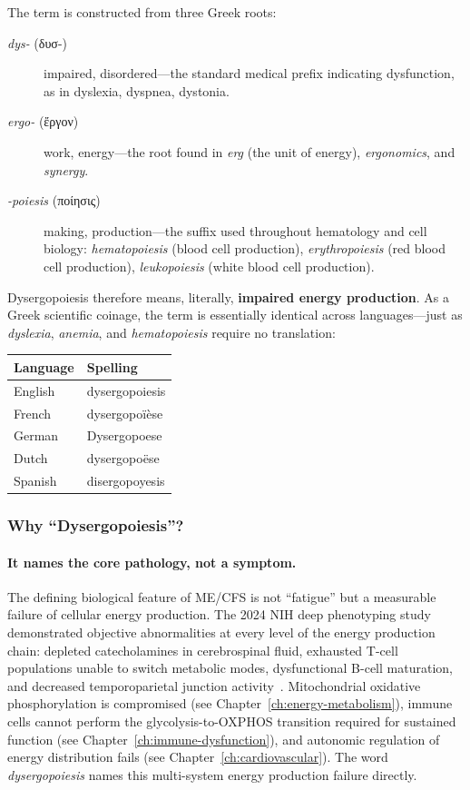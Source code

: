 The term is constructed from three Greek roots:

\begin{description}
    \item[\emph{dys-} (δυσ-)] impaired, disordered---the standard medical prefix indicating dysfunction, as in dys\-lexia, dys\-pnea, dys\-tonia.
    \item[\emph{ergo-} (ἔργον)] work, energy---the root found in \emph{erg} (the unit of energy), \emph{ergonomics}, and \emph{synergy}.
    \item[\emph{-poiesis} (ποίησις)] making, production---the suffix used throughout hematology and cell biology: \emph{hematopoiesis} (blood cell production), \emph{erythropoiesis} (red blood cell production), \emph{leukopoiesis} (white blood cell production).
\end{description}

\noindent Dysergopoiesis therefore means, literally, \textbf{impaired energy production}. As a Greek scientific coinage, the term is essentially identical across languages---just as \emph{dyslexia}, \emph{anemia}, and \emph{hematopoiesis} require no translation:

\begin{center}
\begin{tabular}{ll}
\toprule
\textbf{Language} & \textbf{Spelling} \\
\midrule
English    & dysergopoiesis \\
French     & dysergopoïèse \\
German     & Dysergopoese \\
Dutch      & dysergopoëse \\
Spanish    & disergopoyesis \\
\bottomrule
\end{tabular}
\end{center}

\subsubsection{Why ``Dysergopoiesis''?}

\paragraph{It names the core pathology, not a symptom.}
The defining biological feature of ME/CFS is not ``fatigue'' but a measurable failure of cellular energy production. The 2024 NIH deep phenotyping study demonstrated objective abnormalities at every level of the energy production chain: depleted catecholamines in cerebrospinal fluid, exhausted T-cell populations unable to switch metabolic modes, dysfunctional B-cell maturation, and decreased temporoparietal junction activity~\cite{walitt2024deep}. Mitochondrial oxidative phosphorylation is compromised (see Chapter~\ref{ch:energy-metabolism}), immune cells cannot perform the glycolysis-to-OXPHOS transition required for sustained function (see Chapter~\ref{ch:immune-dysfunction}), and autonomic regulation of energy distribution fails (see Chapter~\ref{ch:cardiovascular}). The word \emph{dysergopoiesis} names this multi-system energy production failure directly.


